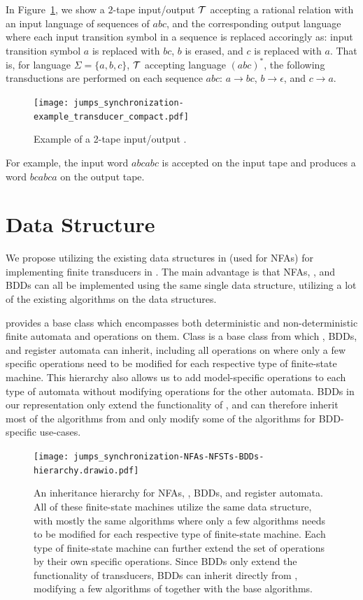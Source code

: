 \begin{example}\label{example:2_tape_nft}
In Figure~\ref{fig:2_tape_nft}, we show a $2$-tape input/output \nft $\mathcal{T}$ accepting a rational relation with an input language of sequences of $abc$, and the corresponding output language where each input transition symbol in a sequence is replaced accoringly as: input transition symbol $a$ is replaced with $bc$, $b$ is erased, and $c$ is replaced with $a$.
That is, for language $\Sigma = \{ a, b, c \}$, $\mathcal{T}$ accepting language $(abc)^*$, the following transductions are performed on each sequence $abc$:
$a \rightarrow bc$,
$b \rightarrow \epsilon$, and
$c \rightarrow a$.

\begin{figure}[!ht]
  \centering
    \texttt{[image: jumps\_synchronization-example\_transducer\_compact.pdf]}
  \caption{
    Example of a 2-tape input/output \nft.
  }\label{fig:2_tape_nft}
\end{figure}

For example, the input word $abcabc$ is accepted on the input tape and produces a word $bcabca$ on the output tape.

\end{example}

\section{Data Structure}
We propose utilizing the existing data structures in \mata (used for NFAs) for implementing finite transducers in \mata.
The main advantage is that NFAs, \nfts, and BDDs can all be implemented using the same single data structure, utilizing a lot of the existing algorithms on the data structures.

\mata provides a base class \nfaClass which encompasses both deterministic and non-deterministic finite automata and operations on them.
Class \nfaClass is a base class from which \nfts, BDDs, and register automata can inherit, including all operations on \nfaClass where only a few specific operations need to be modified for each respective type of finite-state machine.
This hierarchy also allows us to add model-specific operations to each type of automata without modifying operations for the other automata.
BDDs in our representation only extend the functionality of \nfts, and can therefore inherit most of the algorithms from \nfts and only modify some of the algorithms for BDD-specific use-cases.

\begin{figure}[ht]
  \centering
  \texttt{[image: jumps\_synchronization-NFAs-NFSTs-BDDs-hierarchy.drawio.pdf]}
  \caption{
    An inheritance hierarchy for NFAs, \nfts, BDDs, and register automata.
    All of these finite-state machines utilize the same data structure, with mostly the same algorithms where only a few algorithms needs to be modified for each respective type of finite-state machine.
    Each type of finite-state machine can further extend the set of operations by their own specific operations.
    Since BDDs only extend the functionality of transducers, BDDs can inherit directly from \nfts, modifying a few algorithms of \nfts together with the base \nfaClass algorithms.
  }
\end{figure}

